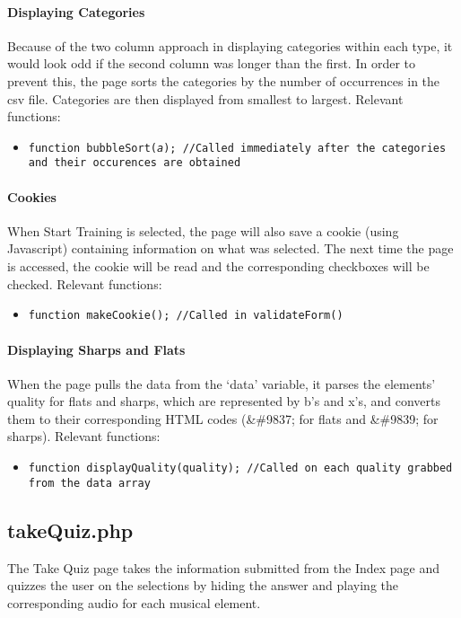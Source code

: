 \documentclass{article}
\begin{document}
\paragraph{Displaying Categories}
Because of the two column approach in displaying categories within each type, it would look odd if the second column was longer than the first. In order to prevent this, the page sorts the categories by the number of occurrences in the csv file. Categories are then displayed from smallest to largest.
\vskip 3mm
\noindent Relevant functions:
\begin{itemize}
\item \texttt{function bubbleSort(\textit{a}); //Called immediately after the categories and their occurences are obtained}
\end{itemize}

\paragraph{Cookies}
When Start Training is selected, the page will also save a cookie (using Javascript) containing information on what was selected. The next time the page is accessed, the cookie will be read and the corresponding checkboxes will be checked.
\vskip 3mm
\noindent Relevant functions:
\begin{itemize}
\item \texttt{function makeCookie(); //Called in validateForm()}
\end{itemize}

\paragraph{Displaying Sharps and Flats}
When the page pulls the data from the `data' variable, it parses the elements' quality for flats and sharps, which are represented by b's and x's, and converts them to their corresponding HTML codes (\&\#9837; for flats and \&\#9839; for sharps).
\vskip 3mm
\noindent Relevant functions:
\begin{itemize}
\item \texttt{function displayQuality(quality); //Called on each quality grabbed from the data array}
\end{itemize}

\subsection{takeQuiz.php}
The Take Quiz page takes the information submitted from the Index page and quizzes the user on the selections by hiding the answer and playing the corresponding audio for each musical element.
\end{document}

